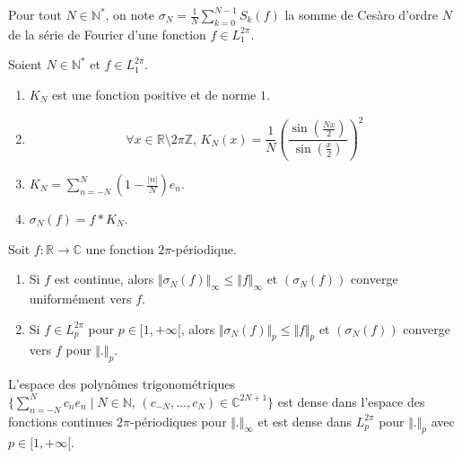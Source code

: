   \begin{notation}
    Pour tout $N \in \mathbb{N}^*$, on note $\sigma_N = \frac{1}{N} \sum_{k=0}^{N-1} S_k(f)$ la somme de Cesàro d'ordre $N$ de la série de Fourier d'une fonction $f \in L_1^{2 \pi}$.
  \end{notation}

  \begin{proposition}
    Soient $N \in \mathbb{N}^*$ et $f \in L_1^{2 \pi}$.
    \begin{enumerate}[label={\bfseries(\roman*)}]
      \item $K_N$ est une fonction positive et de norme $1$.
      \item \[ \forall x \in \mathbb{R} \setminus 2 \pi \mathbb{Z}, \, K_N(x) = \frac{1}{N} \left(\frac{\sin \left( \frac{Nx}{2} \right)}{\sin \left( \frac{x}{2} \right)}\right)^2 \]
      \item $K_N = \sum_{n=-N}^{N} \left(1 - \frac{\vert n \vert}{N}\right) e_n$.
      \item $\sigma_N(f) = f * K_N$.
    \end{enumerate}
  \end{proposition}


  \begin{theorem}
    Soit $f : \mathbb{R} \rightarrow \mathbb{C}$ une fonction $2\pi$-périodique.
    \begin{enumerate}[label={\bfseries(\roman*)}]
      \item Si $f$ est continue, alors $\Vert \sigma_N(f) \Vert_\infty \leq \Vert f \Vert_\infty$ et $(\sigma_N(f))$ converge uniformément vers $f$.
      \item Si $f \in L_p^{2\pi}$ pour $p \in [1,+\infty[$, alors $\Vert \sigma_N(f) \Vert_p \leq \Vert f \Vert_p$ et $(\sigma_N(f))$ converge vers $f$ pour $\Vert . \Vert_p$.
    \end{enumerate}
  \end{theorem}

  \begin{corollary}
    L'espace des polynômes trigonométriques $\{ \sum_{n=-N}^N c_n e_n \mid N \in \mathbb{N}, \, (c_{-N},\dots,c_N) \in \mathbb{C}^{2N+1} \}$ est dense dans l'espace des fonctions continues $2\pi$-périodiques pour $\Vert . \Vert_\infty$ et est dense dans $L_p^{2\pi}$ pour $\Vert . \Vert_p$ avec $p \in [1,+\infty[$.
  \end{corollary}

